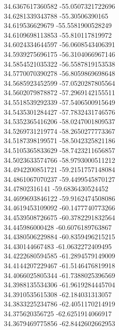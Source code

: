 {34.6367617360582	-55.0507321722696\\
34.6281339343788	-55.30506390165\\
34.619536629679	-55.5581900528249\\
34.6109698113853	-55.810117819972\\
34.6024334644597	-56.0608543406391\\
34.5939275696175	-56.3104066967146\\
34.5854521035322	-56.5587819153538\\
34.5770070390278	-56.8059869698648\\
34.5685923452599	-57.0520287805564\\
34.5602079878872	-57.2969142155511\\
34.5518539292339	-57.5406500915649\\
34.5435301284427	-57.7832431746576\\
34.5352365416206	-58.0247001809537\\
34.5269731219774	-58.2650277773367\\
34.5187398199571	-58.5042325821186\\
34.5105365833629	-58.7423211656857\\
34.5023633574766	-58.9793000511212\\
34.4942200851721	-59.2151757148084\\
34.4861067070237	-59.4499545870127\\
34.47802316141	-59.6836430524452\\
34.4699693846122	-59.9162474508086\\
34.4619453109092	-60.1477740773266\\
34.4539508726675	-60.3782291832564\\
34.445986000428	-60.6076189763867\\
34.4380506229884	-60.8359496215215\\
34.430144667483	-61.0632272409495\\
34.4222680594585	-61.2894579149009\\
34.4144207229467	-61.5146476819918\\
34.4066025805344	-61.7388025396569\\
34.3988135534306	-61.9619284445704\\
34.3910535615308	-62.184031313057\\
34.3833225234786	-62.4051170214919\\
34.375620356725	-62.6251914066917\\
34.3679469775856	-62.8442602662953\\
}
